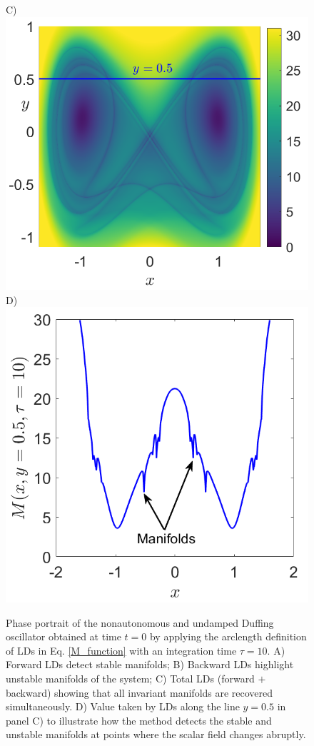\documentclass[8pt]{article}
\begin{document}
\begin{figure}[htbp]
\begin{center}
		C)\includegraphics[scale=0.26]{duffing_tau_10_pert_01.png}
		D)\includegraphics[scale=0.26]{duffing_maniDetect_pert_01.png}
	\end{center}
	\caption{Phase portrait of the nonautonomous and undamped Duffing oscillator obtained at time $t = 0$ by applying the arclength definition of LDs in Eq. \eqref{M_function} with an integration time $\tau = 10$. A) Forward LDs detect stable manifolds; B) Backward LDs highlight unstable manifolds of the system; C) Total LDs (forward $+$ backward) showing that all invariant manifolds are recovered simultaneously. D) Value taken by LDs along the line $y = 0.5$ in panel C) to illustrate how the method detects the stable and unstable manifolds at points where the scalar field changes abruptly.}
	\label{duffing2_lds}
\end{figure}
\end{document}
